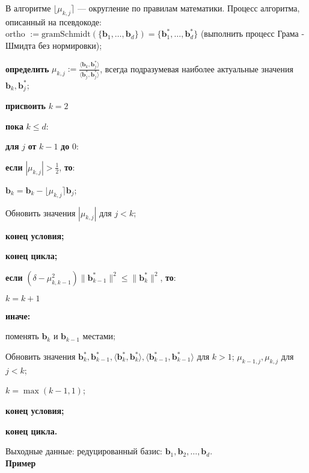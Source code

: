 \documentclass[12pt,a4paper]{scrartcl}
\begin{document}
В алгоритме $\lfloor \mu _{k,j}\rceil$ — округление по правилам математики. Процесс алгоритма, описанный на псевдокоде:\\


ortho $:=\mathrm {gramSchmidt} (\{\mathbf {b} _{1},\dots ,\mathbf {b} _{d}\})=\{\mathbf {b} _{1}^{*},\dots ,\mathbf {b} _{d}^{*}\}$ (выполнить процесс Грама - Шмидта без нормировки);

\textbf{определить} $\mu _{k,j}:={\frac {\langle \mathbf {b} _{k},\mathbf {b} _{j}^{*}\rangle }{\langle \mathbf {b} _{j}^{*},\mathbf {b} _{j}^{*}\rangle }}$, всегда подразумевая наиболее актуальные значения $\mathbf {b} _{k},\mathbf {b} _{j}^{*}$;

\textbf{присвоить} $k=2$

\textbf{пока} $k\leqslant d$:

\qquad \textbf{для} $j$ \textbf{от} $k-1$ \textbf{до} $0$:

\qquad \qquad \textbf{если} $|\mu _{k,j}|>{\frac {1}{2}}$, \textbf{то}:

\qquad \qquad\qquad $\mathbf {b} _{k}=\mathbf {b} _{k}-\lfloor \mu _{k,j}\rceil \mathbf {b} _{j}$;

\qquad \qquad\qquad Обновить значения $|\mu _{k,j}|$ для $j<k$;

\qquad \qquad \textbf{конец условия;}

\qquad \textbf{конец цикла;}

\qquad \textbf{если} $(\delta -\mu _{k,k-1}^{2})\|\mathbf {b} _{k-1}^{*}\|^{2}\leqslant \|\mathbf {b}_{k}^{*}\|^{2}$, \textbf{то}:

\qquad \qquad $k=k+1$

\qquad \textbf{иначе:}

\qquad \qquad поменять $\mathbf {b} _{k}$ и $\mathbf {b} _{k-1}$ местами;

\qquad \qquad Обновить значения $\mathbf {b} _{k}^{*},\mathbf {b} _{k-1}^{*},\langle \mathbf {b} _{k}^{*},\mathbf {b} _{k}^{*}\rangle ,\langle \mathbf {b} _{k-1}^{*},\mathbf {b} _{k-1}^{*}\rangle$ для $k>1$; $\mu _{k-1,j},\mu _{k,j}$ для $j<k$;

\qquad \qquad $k=\max(k-1,1)$;

\qquad \textbf{конец условия;}

\textbf{конец цикла.}

Выходные данные: редуцированный базис: $\mathbf {b} _{1},\mathbf {b} _{2},\dots ,\mathbf {b} _{d}$.\\ 

\textbf{Пример}
\end{document}
